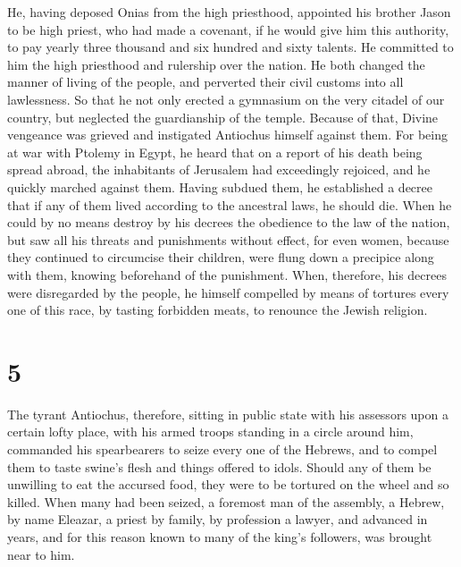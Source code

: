  He, having deposed Onias from the high priesthood,
appointed his brother Jason to be high priest,  who had
made a covenant, if he would give him this authority, to pay yearly
three thousand and six hundred and sixty talents.  He
committed to him the high priesthood and rulership over the nation.
 He both changed the manner of living of the people, and
perverted their civil customs into all lawlessness.  So
that he not only erected a gymnasium on the very citadel of our country,
but neglected the guardianship of the temple.  Because of
that, Divine vengeance was grieved and instigated Antiochus himself
against them.  For being at war with Ptolemy in Egypt, he
heard that on a report of his death being spread abroad, the inhabitants
of Jerusalem had exceedingly rejoiced, and he quickly marched against
them.  Having subdued them, he established a decree that if
any of them lived according to the ancestral laws, he should die.
 When he could by no means destroy by his decrees the
obedience to the law of the nation, but saw all his threats and
punishments without effect,  for even women, because they
continued to circumcise their children, were flung down a precipice
along with them, knowing beforehand of the punishment. 
When, therefore, his decrees were disregarded by the people, he himself
compelled by means of tortures every one of this race, by tasting
forbidden meats, to renounce the Jewish religion.

\hypertarget{section-4}{%
\section{5}\label{section-4}}

 The tyrant Antiochus, therefore, sitting in public state
with his assessors upon a certain lofty place, with his armed troops
standing in a circle around him,  commanded his spearbearers
to seize every one of the Hebrews, and to compel them to taste swine's
flesh and things offered to idols.  Should any of them be
unwilling to eat the accursed food, they were to be tortured on the
wheel and so killed.  When many had been seized, a foremost
man of the assembly, a Hebrew, by name Eleazar, a priest by family, by
profession a lawyer, and advanced in years, and for this reason known to
many of the king's followers, was brought near to him.


